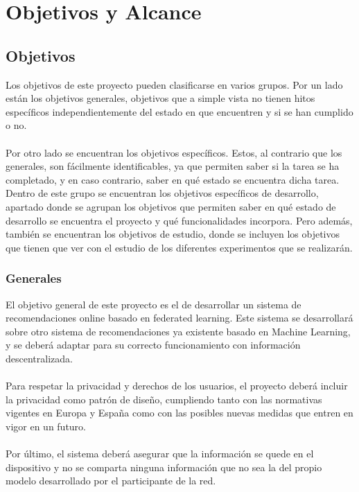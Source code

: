 \chapter{Objetivos y Alcance}
\thispagestyle{fancy}
\section{Objetivos}
Los objetivos de este proyecto pueden clasificarse en varios grupos. Por un lado están los objetivos generales, objetivos que a simple vista no tienen hitos específicos independientemente del estado en que encuentren y si se han cumplido o no.
\\ \\
Por otro lado se encuentran los objetivos específicos. Estos, al contrario que los generales, son fácilmente identificables, ya que permiten saber si la tarea se ha completado, y en caso contrario, saber en qué estado se encuentra dicha tarea. Dentro de este grupo se encuentran los objetivos específicos de desarrollo, apartado donde se agrupan los objetivos que permiten saber en qué estado de desarrollo se encuentra el proyecto y qué funcionalidades incorpora. Pero además, también se encuentran los objetivos de estudio, donde se incluyen los objetivos que tienen que ver con el estudio de los diferentes experimentos que se realizarán. 

\subsection{Generales}
El objetivo general de este proyecto es el de desarrollar un sistema de recomendaciones online basado en federated learning. Este sistema se desarrollará sobre otro sistema de recomendaciones ya existente basado en Machine Learning, y se deberá adaptar para su correcto funcionamiento con información descentralizada.
\\ \\
Para respetar la privacidad y derechos de los usuarios, el proyecto deberá incluir la privacidad como patrón de diseño, cumpliendo tanto con las normativas vigentes en Europa y España como con las posibles nuevas medidas que entren en vigor en un futuro. 
\\ \\
Por último, el sistema deberá asegurar que la información se quede en el dispositivo y no se comparta ninguna información que no sea la del propio modelo desarrollado por el participante de la red.

